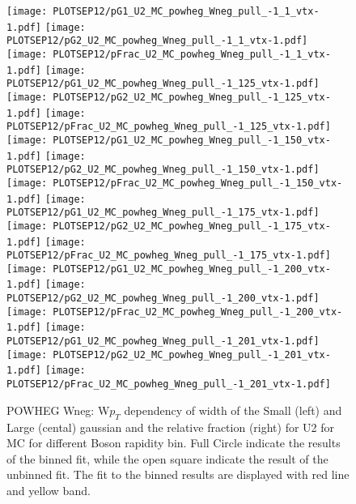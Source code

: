 \documentclass[41pt,a4paper,oneside]{report}
\begin{document}
\begin{figure}[h!]
  \begin{center}
    \texttt{[image: PLOTSEP12/pG1\_U2\_MC\_powheg\_Wneg\_pull\_-1\_1\_vtx-1.pdf]}
    \texttt{[image: PLOTSEP12/pG2\_U2\_MC\_powheg\_Wneg\_pull\_-1\_1\_vtx-1.pdf]}
    \texttt{[image: PLOTSEP12/pFrac\_U2\_MC\_powheg\_Wneg\_pull\_-1\_1\_vtx-1.pdf]} 
    \texttt{[image: PLOTSEP12/pG1\_U2\_MC\_powheg\_Wneg\_pull\_-1\_125\_vtx-1.pdf]}
    \texttt{[image: PLOTSEP12/pG2\_U2\_MC\_powheg\_Wneg\_pull\_-1\_125\_vtx-1.pdf]}
    \texttt{[image: PLOTSEP12/pFrac\_U2\_MC\_powheg\_Wneg\_pull\_-1\_125\_vtx-1.pdf]} 
    \texttt{[image: PLOTSEP12/pG1\_U2\_MC\_powheg\_Wneg\_pull\_-1\_150\_vtx-1.pdf]}
    \texttt{[image: PLOTSEP12/pG2\_U2\_MC\_powheg\_Wneg\_pull\_-1\_150\_vtx-1.pdf]}
    \texttt{[image: PLOTSEP12/pFrac\_U2\_MC\_powheg\_Wneg\_pull\_-1\_150\_vtx-1.pdf]} 
    \texttt{[image: PLOTSEP12/pG1\_U2\_MC\_powheg\_Wneg\_pull\_-1\_175\_vtx-1.pdf]}
    \texttt{[image: PLOTSEP12/pG2\_U2\_MC\_powheg\_Wneg\_pull\_-1\_175\_vtx-1.pdf]}
    \texttt{[image: PLOTSEP12/pFrac\_U2\_MC\_powheg\_Wneg\_pull\_-1\_175\_vtx-1.pdf]} 
    \texttt{[image: PLOTSEP12/pG1\_U2\_MC\_powheg\_Wneg\_pull\_-1\_200\_vtx-1.pdf]}
    \texttt{[image: PLOTSEP12/pG2\_U2\_MC\_powheg\_Wneg\_pull\_-1\_200\_vtx-1.pdf]}
    \texttt{[image: PLOTSEP12/pFrac\_U2\_MC\_powheg\_Wneg\_pull\_-1\_200\_vtx-1.pdf]} 
    \texttt{[image: PLOTSEP12/pG1\_U2\_MC\_powheg\_Wneg\_pull\_-1\_201\_vtx-1.pdf]}
    \texttt{[image: PLOTSEP12/pG2\_U2\_MC\_powheg\_Wneg\_pull\_-1\_201\_vtx-1.pdf]}
    \texttt{[image: PLOTSEP12/pFrac\_U2\_MC\_powheg\_Wneg\_pull\_-1\_201\_vtx-1.pdf]} 
    \caption{POWHEG Wneg: W$p_{T}$ dependency of width of the Small (left) and Large (cental) gaussian and the relative fraction (right) for U2 for MC for different Boson rapidity bin. Full Circle indicate the results of the binned fit, while the open square indicate the result of the unbinned fit. The fit to the binned results are displayed with red line and yellow band.
\newline
}
    \label{fig:SmallLargeU2POWneg}
  \end{center}
\end{figure}
\end{document}
